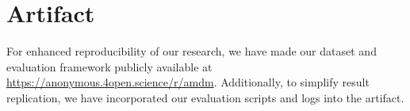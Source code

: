 \section{Artifact}
\label{sec:data-artifact}
For enhanced reproducibility of our research, we have made our dataset and evaluation framework publicly available at \url{https://anonymous.4open.science/r/amdm}. Additionally, to simplify result replication, we have incorporated our evaluation scripts and logs into the artifact.